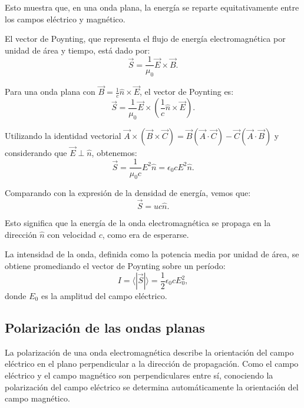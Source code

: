 \documentclass[12pt,a4paper]{book}
\begin{document}
Esto muestra que, en una onda plana, la energía se reparte equitativamente entre los campos eléctrico y magnético.

El vector de Poynting, que representa el flujo de energía electromagnética por unidad de área y tiempo, está dado por:
\begin{equation}
\vec{S} = \frac{1}{\mu_0}\vec{E} \times \vec{B}.
\end{equation}

Para una onda plana con $\vec{B} = \frac{1}{c}\hat{n} \times \vec{E}$, el vector de Poynting es:
\begin{equation}
\vec{S} = \frac{1}{\mu_0}\vec{E} \times \left(\frac{1}{c}\hat{n} \times \vec{E}\right).
\end{equation}

Utilizando la identidad vectorial $\vec{A} \times (\vec{B} \times \vec{C}) = \vec{B}(\vec{A} \cdot \vec{C}) - \vec{C}(\vec{A} \cdot \vec{B})$ y considerando que $\vec{E} \perp \hat{n}$, obtenemos:
\begin{equation}
\vec{S} = \frac{1}{\mu_0 c}E^2 \hat{n} = \epsilon_0 c E^2 \hat{n}.
\end{equation}

Comparando con la expresión de la densidad de energía, vemos que:
\begin{equation}
\vec{S} = u c \hat{n}.
\end{equation}

Esto significa que la energía de la onda electromagnética se propaga en la dirección $\hat{n}$ con velocidad $c$, como era de esperarse.

La intensidad de la onda, definida como la potencia media por unidad de área, se obtiene promediando el vector de Poynting sobre un período:
\begin{equation}
I = \langle |\vec{S}| \rangle = \frac{1}{2}\epsilon_0 c E_0^2,
\end{equation}
donde $E_0$ es la amplitud del campo eléctrico.

\subsection{Polarización de las ondas planas}

La polarización de una onda electromagnética describe la orientación del campo eléctrico en el plano perpendicular a la dirección de propagación. Como el campo eléctrico y el campo magnético son perpendiculares entre sí, conociendo la polarización del campo eléctrico se determina automáticamente la orientación del campo magnético.
\end{document}
